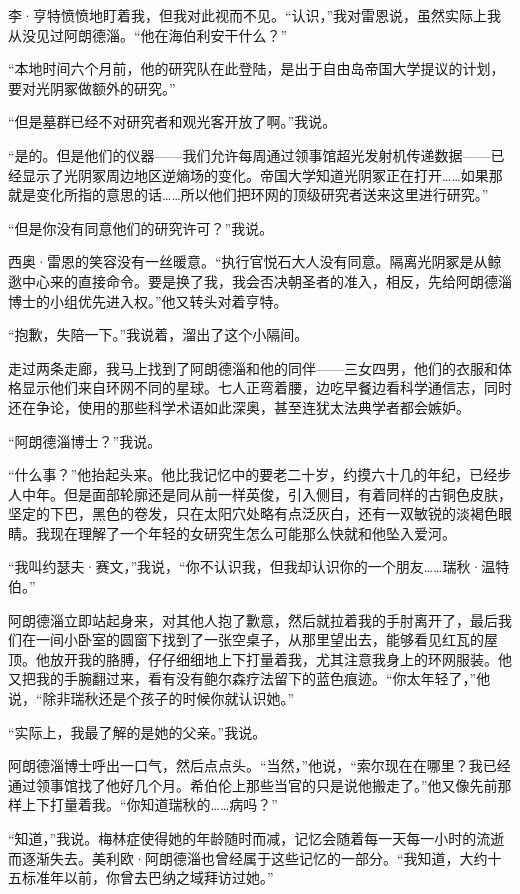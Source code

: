 \documentclass[AutoFakeBold=true]{book}
\begin{document}
李·亨特愤愤地盯着我，但我对此视而不见。``认识，''我对雷恩说，虽然实际上我从没见过阿朗德淄。``他在海伯利安干什么？''

``本地时间六个月前，他的研究队在此登陆，是出于自由岛帝国大学提议的计划，要对光阴冢做额外的研究。''

``但是墓群已经不对研究者和观光客开放了啊。''我说。

``是的。但是他们的仪器——我们允许每周通过领事馆超光发射机传递数据——已经显示了光阴冢周边地区逆熵场的变化。帝国大学知道光阴冢正在打开……如果那就是变化所指的意思的话……所以他们把环网的顶级研究者送来这里进行研究。''

``但是你没有同意他们的研究许可？''我说。

西奥·雷恩的笑容没有一丝暖意。``执行官悦石大人没有同意。隔离光阴冢是从鲸逖中心来的直接命令。要是换了我，我会否决朝圣者的准入，相反，先给阿朗德淄博士的小组优先进入权。''他又转头对着亨特。

``抱歉，失陪一下。''我说着，溜出了这个小隔间。

\vspace*{1em}

走过两条走廊，我马上找到了阿朗德淄和他的同伴——三女四男，他们的衣服和体格显示他们来自环网不同的星球。七人正弯着腰，边吃早餐边看科学通信志，同时还在争论，使用的那些科学术语如此深奥，甚至连犹太法典学者都会嫉妒。

``阿朗德淄博士？''我说。

``什么事？''他抬起头来。他比我记忆中的要老二十岁，约摸六十几的年纪，已经步人中年。但是面部轮廓还是同从前一样英俊，引入侧目，有着同样的古铜色皮肤，坚定的下巴，黑色的卷发，只在太阳穴处略有点泛灰白，还有一双敏锐的淡褐色眼睛。我现在理解了一个年轻的女研究生怎么可能那么快就和他坠入爱河。

``我叫约瑟夫·赛文，''我说，``你不认识我，但我却认识你的一个朋友……瑞秋·温特伯。''

阿朗德淄立即站起身来，对其他人抱了歉意，然后就拉着我的手肘离开了，最后我们在一间小卧室的圆窗下找到了一张空桌子，从那里望出去，能够看见红瓦的屋顶。他放开我的胳膊，仔仔细细地上下打量着我，尤其注意我身上的环网服装。他又把我的手腕翻过来，看有没有鲍尔森疗法留下的蓝色痕迹。``你太年轻了，''他说，``除非瑞秋还是个孩子的时候你就认识她。''

``实际上，我最了解的是她的父亲。''我说。

阿朗德淄博士呼出一口气，然后点点头。``当然，''他说，``索尔{\kaishu 现在}在哪里？我已经通过领事馆找了他好几个月。希伯伦上那些当官的只是说他搬走了。''他又像先前那样上下打量着我。``你知道瑞秋的……病吗？''

``知道，''我说。梅林症使得她的年龄随时而减，记忆会随着每一天每一小时的流逝而逐渐失去。美利欧·阿朗德淄也曾经属于这些记忆的一部分。``我知道，大约十五标准年以前，你曾去巴纳之域拜访过她。''
\end{document}
